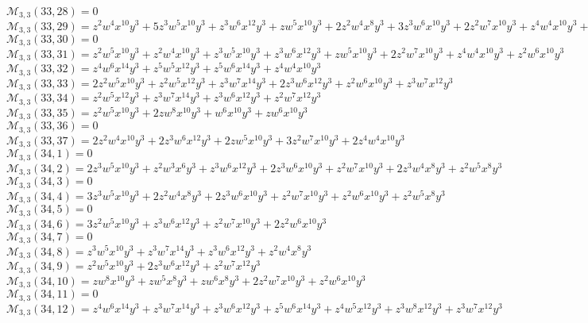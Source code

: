 $\mathcal{M}_{3,3}(33,28)=0$\\
$\mathcal{M}_{3,3}(33,29)=z^2w^4x^{10}y^3+5z^3w^5x^{10}y^3+z^3w^6x^{12}y^3+zw^5x^{10}y^3+2z^2w^4x^8y^3+3z^3w^6x^{10}y^3+2z^2w^7x^{10}y^3+z^4w^4x^{10}y^3+z^2w^5x^8y^3$\\
$\mathcal{M}_{3,3}(33,30)=0$\\
$\mathcal{M}_{3,3}(33,31)=z^2w^5x^{10}y^3+z^2w^4x^{10}y^3+z^3w^5x^{10}y^3+z^3w^6x^{12}y^3+zw^5x^{10}y^3+2z^2w^7x^{10}y^3+z^4w^4x^{10}y^3+z^2w^6x^{10}y^3$\\
$\mathcal{M}_{3,3}(33,32)=z^4w^6x^{14}y^3+z^5w^5x^{12}y^3+z^5w^6x^{14}y^3+z^4w^4x^{10}y^3$\\
$\mathcal{M}_{3,3}(33,33)=2z^2w^5x^{10}y^3+z^2w^5x^{12}y^3+z^3w^7x^{14}y^3+2z^3w^6x^{12}y^3+z^2w^6x^{10}y^3+z^3w^7x^{12}y^3$\\
$\mathcal{M}_{3,3}(33,34)=z^2w^5x^{12}y^3+z^3w^7x^{14}y^3+z^3w^6x^{12}y^3+z^2w^7x^{12}y^3$\\
$\mathcal{M}_{3,3}(33,35)=z^2w^5x^{10}y^3+2zw^8x^{10}y^3+w^6x^{10}y^3+zw^6x^{10}y^3$\\
$\mathcal{M}_{3,3}(33,36)=0$\\
$\mathcal{M}_{3,3}(33,37)=2z^2w^4x^{10}y^3+2z^3w^6x^{12}y^3+2zw^5x^{10}y^3+3z^2w^7x^{10}y^3+2z^4w^4x^{10}y^3$\\
$\mathcal{M}_{3,3}(34,1)=0$\\
$\mathcal{M}_{3,3}(34,2)=2z^3w^5x^{10}y^3+z^2w^3x^6y^3+z^3w^6x^{12}y^3+2z^3w^6x^{10}y^3+z^2w^7x^{10}y^3+2z^3w^4x^8y^3+z^2w^5x^8y^3$\\
$\mathcal{M}_{3,3}(34,3)=0$\\
$\mathcal{M}_{3,3}(34,4)=3z^3w^5x^{10}y^3+2z^2w^4x^8y^3+2z^3w^6x^{10}y^3+z^2w^7x^{10}y^3+z^2w^6x^{10}y^3+z^2w^5x^8y^3$\\
$\mathcal{M}_{3,3}(34,5)=0$\\
$\mathcal{M}_{3,3}(34,6)=3z^2w^5x^{10}y^3+z^3w^6x^{12}y^3+z^2w^7x^{10}y^3+2z^2w^6x^{10}y^3$\\
$\mathcal{M}_{3,3}(34,7)=0$\\
$\mathcal{M}_{3,3}(34,8)=z^3w^5x^{10}y^3+z^3w^7x^{14}y^3+z^3w^6x^{12}y^3+z^2w^4x^8y^3$\\
$\mathcal{M}_{3,3}(34,9)=z^2w^5x^{10}y^3+2z^3w^6x^{12}y^3+z^2w^7x^{12}y^3$\\
$\mathcal{M}_{3,3}(34,10)=zw^8x^{10}y^3+zw^5x^8y^3+zw^6x^8y^3+2z^2w^7x^{10}y^3+z^2w^6x^{10}y^3$\\
$\mathcal{M}_{3,3}(34,11)=0$\\
$\mathcal{M}_{3,3}(34,12)=z^4w^6x^{14}y^3+z^3w^7x^{14}y^3+z^3w^6x^{12}y^3+z^5w^6x^{14}y^3+z^4w^5x^{12}y^3+z^3w^8x^{12}y^3+z^3w^7x^{12}y^3$\\
